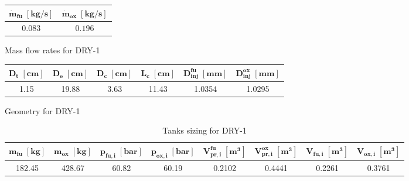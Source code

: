 \vspace*{5mm}

\begin{minipage}{0.35\linewidth}
    \centering
    \small
    \captionsetup{type=table}
    \renewcommand{\arraystretch}{1.4}
    \begin{tabular}{|c|c|}
        \hline
        $\boldsymbol{\dot{m}_{fu} \; [\textbf{kg/s}]}$  &
        $\boldsymbol{\dot{m}_{ox} \; [\textbf{kg/s}]}$  \\
        \hline
        \hline
        $0.083$ & $0.196$ \\
        \hline
    \end{tabular}
    \caption{Mass flow rates for DRY-1}
    \label{table:flow_rates_final}
\end{minipage}\hfill
\begin{minipage}{0.65\linewidth}
    \centering
    \small
    \captionsetup{type=table}
    \renewcommand{\arraystretch}{1.4}
    \begin{tabular}{|c|c|c|c|c|c|}
        \hline
        $\boldsymbol{D_t \; [\textbf{cm}]}$             &
        $\boldsymbol{D_e \; [\textbf{cm}]}$             &
        $\boldsymbol{D_c \; [\textbf{cm}]}$             &
        $\boldsymbol{L_c \; [\textbf{cm}]}$             &
        $\boldsymbol{D_{inj}^{fu} \; [\textbf{mm}]}$    &
        $\boldsymbol{D_{inj}^{ox} \; [\textbf{mm}]}$    \\
        \hline
        \hline
        1.15 & 19.88 & 3.63 & 11.43 & 1.0354 & 1.0295 \\
        \hline
    \end{tabular}
    \caption{Geometry for DRY-1}
    \label{table:geometry_final}
\end{minipage} 

\begin{table}[H]
    \renewcommand{\arraystretch}{1.5}
    \centering
    \small
    \begin{tabular}{|c|c|c|c|c|c|c|c|}
        \hline
        $\boldsymbol{m_{fu} \; [\textbf{kg}]}$              &
        $\boldsymbol{m_{ox} \; [\textbf{kg}]}$              &
        $\boldsymbol{p_{fu,i} \; [\textbf{bar}]}$           &
        $\boldsymbol{p_{ox,i} \; [\textbf{bar}]}$           &
        $\boldsymbol{V_{pr, i}^{fu} \; [\textbf{m}^3]}$     &
        $\boldsymbol{V_{pr, i}^{ox} \; [\textbf{m}^3]}$     &
        $\boldsymbol{V_{fu, i} \; [\textbf{m}^3]}$          &
        $\boldsymbol{V_{ox, i} \; [\textbf{m}^3]}$          \\
        \hline
        \hline
        182.45 & 428.67 & 60.82 & 60.19 & 0.2102 & 0.4441 & 0.2261 & 0.3761 \\
        \hline
    \end{tabular}
    \caption{Tanks sizing for DRY-1}
    \label{table:tanks_final}
\end{table}

